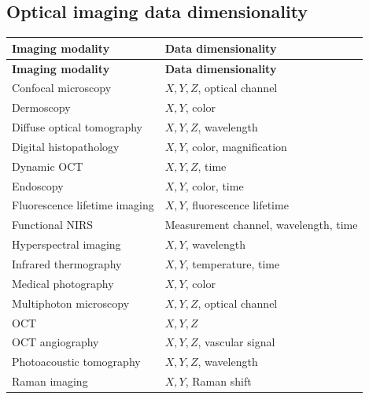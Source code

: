 \subsection{Optical imaging data dimensionality}
\begin{longtable}{@{}p{}p{}@{}}
\toprule
\textbf{Imaging modality} & \textbf{Data dimensionality} \\
\midrule
\endfirsthead
\toprule
\textbf{Imaging modality} & \textbf{Data dimensionality} \\
\midrule
\endhead
Confocal microscopy & $X, Y, Z$, optical channel \\
Dermoscopy & $X, Y$, color \\
Diffuse optical tomography & $X, Y, Z$, wavelength \\
Digital histopathology & $X, Y$, color, magnification \\
Dynamic OCT & $X, Y, Z$, time \\
Endoscopy & $X, Y$, color, time \\
Fluorescence lifetime imaging & $X, Y$, fluorescence lifetime \\
Functional NIRS & Measurement channel, wavelength, time \\
Hyperspectral imaging & $X, Y$, wavelength \\
Infrared thermography & $X, Y$, temperature, time \\
Medical photography & $X, Y$, color \\
Multiphoton microscopy & $X, Y, Z$, optical channel \\
OCT & $X, Y, Z$ \\
OCT angiography & $X, Y, Z$, vascular signal \\
Photoacoustic tomography & $X, Y, Z$, wavelength \\
Raman imaging & $X, Y$, Raman shift \\
\bottomrule
\end{longtable}


